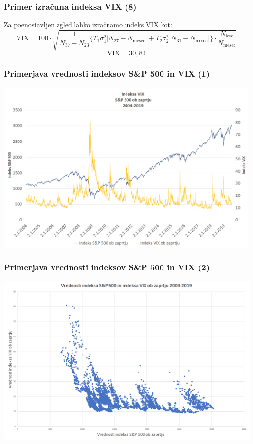\documentclass[10pt]{beamer}
\begin{document}
\begin{frame}
\frametitle{Primer izračuna indeksa VIX (8)}
Za poenostavljen zgled lahko izračnamo indeks VIX kot:
$$
\text{VIX} = 100 \cdot \sqrt{\frac{1}{N_{37}-N_{23}}\Bigg\{T_1\sigma_1^2\left\lvert N_{27} -N_{\text{mesec}}\right\rvert  + T_2\sigma_2^2\left\lvert N_{31} -N_{\text{mesec}}\right\rvert \Bigg\}\cdot \frac{N_\text{leto}}{N_{\text{mesec}}}}
$$
$$
\text{VIX} = 30,84
$$
\end{frame}


\begin{frame}
\frametitle{Primerjava vrednosti indeksov S\&P 500 in VIX (1)}
\includegraphics[width=1\textwidth]{./Grafi/VIX_vs_SPX_2004-2019.png}
\end{frame}


\begin{frame}
\frametitle{Primerjava vrednosti indeksov S\&P 500 in VIX (2)}
\includegraphics[width=1\textwidth]{./Grafi/VIX_vs_SPX.png}
\end{frame}
\end{document}
